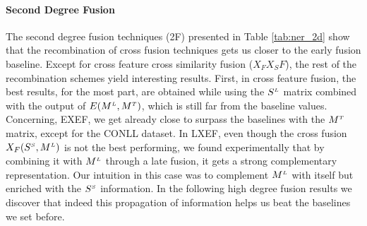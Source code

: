 \paragraph{Second Degree Fusion} 
The second degree fusion techniques (2F) presented in Table \ref{tab:ner_2d} show that the recombination of cross fusion techniques gets us closer to the early fusion baseline. Except for cross feature cross similarity fusion ($X_FX_SF$), the rest of the recombination schemes yield interesting results. First, in cross feature fusion, the best results, for the most part, are obtained while using the $S^{\scriptscriptstyle L}$ matrix combined with the output of $E(M^{\scriptscriptstyle L}, M^{\scriptscriptstyle T})$, which is still far from the baseline values. Concerning, EXEF, we get already close to surpass the baselines with the $M^{\scriptscriptstyle T}$ matrix, except for the CONLL dataset. In LXEF, even though the cross fusion $X_F(S^{\scriptscriptstyle S}, M^{\scriptscriptstyle L})$ is not the best performing, we found experimentally that by combining it with $M^{\scriptscriptstyle L}$ through a late fusion, it gets  a strong complementary representation. Our intuition in this case was to complement $M^{\scriptscriptstyle L}$ with itself but enriched with the $S^{\scriptscriptstyle S}$ information. In the following high degree fusion results we discover that indeed this propagation of information helps us beat the baselines we set before.


